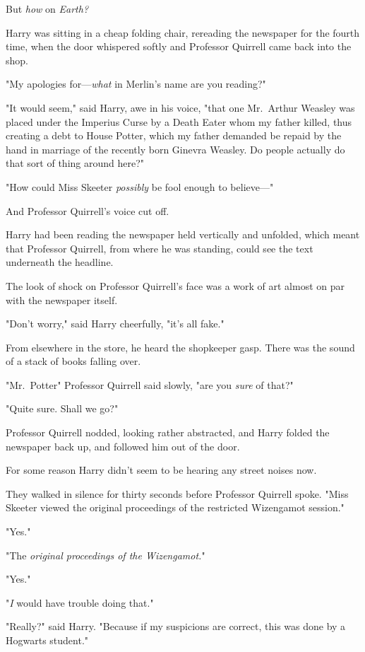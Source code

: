But \emph{how} on \emph{Earth{\el}?}

Harry was sitting in a cheap folding chair, rereading the newspaper for the
fourth time, when the door whispered softly and Professor Quirrell came back
into the shop.

"My apologies for---\emph{what} in Merlin's name are you reading?"

"It would seem," said Harry, awe in his voice, "that one Mr.~Arthur Weasley was
placed under the Imperius Curse by a Death Eater whom my father killed, thus
creating a debt to House Potter, which my father demanded be repaid by the hand
in marriage of the recently born Ginevra Weasley. Do people actually do that
sort of thing around here?"

"How could Miss Skeeter \emph{possibly} be fool enough to believe\mbox{---}"

And Professor Quirrell's voice cut off.

Harry had been reading the newspaper held vertically and unfolded, which meant
that Professor Quirrell, from where he was standing, could see the text
underneath the headline.

The look of shock on Professor Quirrell's face was a work of art almost on par
with the newspaper itself.

"Don't worry," said Harry cheerfully, "it's all fake."

From elsewhere in the store, he heard the shopkeeper gasp. There was the sound
of a stack of books falling over.

"Mr.~Potter{\el}" Professor Quirrell said slowly, "are you \emph{sure} of
that?"

"Quite sure. Shall we go?"

Professor Quirrell nodded, looking rather abstracted, and Harry folded the
newspaper back up, and followed him out of the door.

For some reason Harry didn't seem to be hearing any street noises now.

They walked in silence for thirty seconds before Professor Quirrell spoke.
"Miss Skeeter viewed the original proceedings of the restricted Wizengamot
session."

"Yes."

"The \emph{original proceedings of the Wizengamot.}"

"Yes."

"\emph{I} would have trouble doing that."

"Really?" said Harry. "Because if my suspicions are correct, this was done by a
Hogwarts student."

